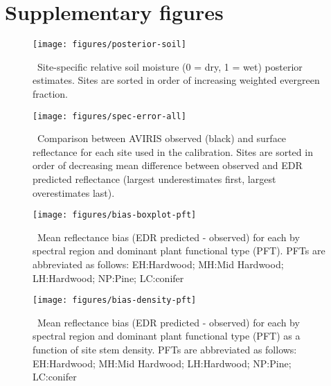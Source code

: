 \section{Supplementary figures}

\begin{figure}[ht]
  \centering
  \texttt{[image: figures/posterior-soil]}
  \caption{\label{fig:posterior-soil}\
    Site-specific relative soil moisture (0 = dry, 1 = wet) posterior estimates.
    Sites are sorted in order of increasing weighted evergreen fraction.
  }
\end{figure}

\clearpage

\begin{figure}
  \centering
  \texttt{[image: figures/spec-error-all]}
  \caption{\label{fig:spec-error-allsites}\
    Comparison between AVIRIS observed (black) and
    surface reflectance for each site used in the calibration.
    Sites are sorted in order of decreasing mean difference between observed and EDR predicted reflectance
    (largest underestimates first, largest overestimates last).
  }
\end{figure}

\clearpage

\begin{figure}
  \centering
  \texttt{[image: figures/bias-boxplot-pft]}
  \caption{\label{fig:bias-boxplot-pft}\
    Mean reflectance bias (EDR predicted - observed) for each by spectral region and dominant plant functional type (PFT).
    PFTs are abbreviated as follows:
    EH:\@Early Hardwood;
    MH:\@North Mid Hardwood;
    LH:\@Late Hardwood;
    NP:\@Northern Pine;
    LC:\@Late conifer
  }
\end{figure}

\clearpage

\begin{figure}
  \centering
  \texttt{[image: figures/bias-density-pft]}
  \caption{\label{fig:bias-density-pft}\
    Mean reflectance bias (EDR predicted - observed) for each by spectral region and dominant plant functional type (PFT) as a function of site stem density.
    PFTs are abbreviated as follows:
    EH:\@Early Hardwood;
    MH:\@North Mid Hardwood;
    LH:\@Late Hardwood;
    NP:\@Northern Pine;
    LC:\@Late conifer
  }
\end{figure}

\clearpage

